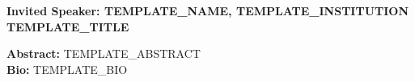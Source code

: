\begin{center}
\textbf{Invited Speaker: TEMPLATE_NAME, TEMPLATE_INSTITUTION}\\
\textbf{TEMPLATE_TITLE}
\end{center}

\textbf{Abstract:} TEMPLATE_ABSTRACT\\
\newline
\textbf{Bio:} TEMPLATE_BIO
\newpage
